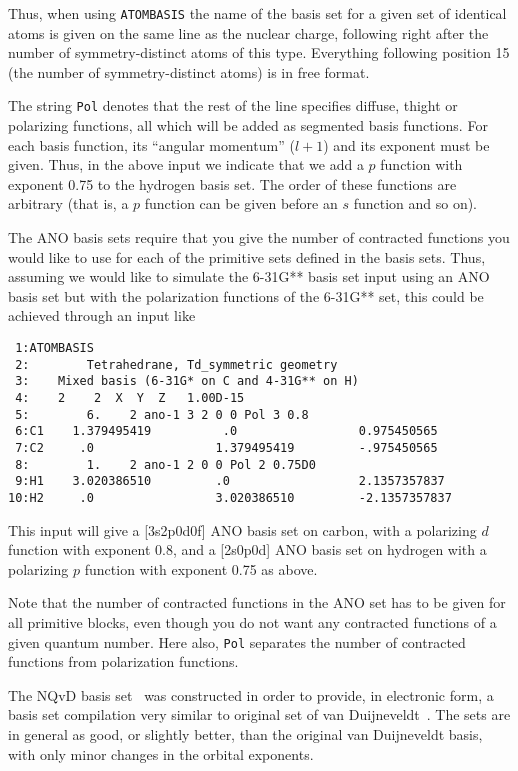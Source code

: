 Thus, when using {\tt ATOMBASIS} the name of the
basis set for a given 
set of identical atoms is given on the same line as the nuclear
charge, following right after the number of symmetry-distinct atoms of
this type. Everything following position 15 (the number of
symmetry-distinct atoms) is in free format.

The string {\tt Pol} denotes that the rest of the line specifies
diffuse, thight or polarizing functions,
all which will be added as 
segmented basis functions. For each basis function, its ``angular
momentum'' ($l+1$) and its exponent must be given. Thus, in the above
input we indicate that we add a $p$ function with exponent 0.75 to the
hydrogen basis set. The order of these functions are arbitrary (that
is, a $p$ function can be given before an $s$ function and so on).

The ANO basis sets require that you give the number of contracted
functions you would like to use for each of the primitive sets defined
in the basis sets. Thus, assuming we would like to simulate the
6-31G** basis set input using an ANO basis set but with the
polarization functions of the 6-31G** set, this could be achieved
through an input like

\begin{verbatim}
 1:ATOMBASIS
 2:        Tetrahedrane, Td_symmetric geometry
 3:    Mixed basis (6-31G* on C and 4-31G** on H)
 4:    2    2  X  Y  Z   1.00D-15
 5:        6.    2 ano-1 3 2 0 0 Pol 3 0.8
 6:C1    1.379495419          .0                 0.975450565  
 7:C2     .0                 1.379495419         -.975450565  
 8:        1.    2 ano-1 2 0 0 Pol 2 0.75D0
 9:H1    3.020386510         .0                  2.1357357837 
10:H2     .0                 3.020386510         -2.1357357837
\end{verbatim}

This input will give a [3s2p0d0f] ANO basis set
on carbon, with a 
polarizing $d$ function with exponent 0.8, and a [2s0p0d] ANO basis
set on hydrogen with a polarizing $p$ function with exponent 0.75 as
above.

Note that the number of contracted functions in the ANO set has to be 
given for all primitive blocks, even though you do not want any
contracted functions of a given quantum number. Here also, {\tt Pol}
separates the number of contracted functions from polarization
functions.

The NQvD basis set~\cite{nqvdref} was constructed in order to provide,
in electronic form, a basis set compilation very similar to original
set of van Duijneveldt~\cite{fbvdibmrap}. The
sets are in general as 
good, or slightly better, than the original van Duijneveldt basis,
with only minor changes in the orbital exponents.

